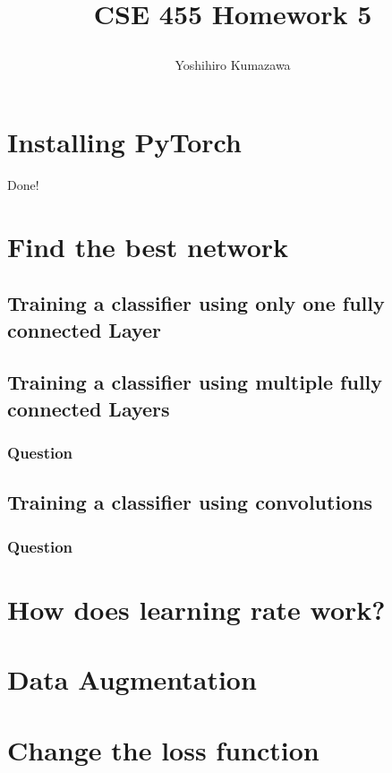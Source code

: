 \documentclass[12pt]{article}
\title{
  \vspace{-2cm}
  CSE 455 Homework 5 \\
  \author{Yoshihiro Kumazawa}
}
\begin{document}
\maketitle

\section{Installing PyTorch}
Done!

\section{Find the best network}
\subsection{Training a classifier using only one fully connected Layer}

\subsection{Training a classifier using multiple fully connected Layers}
\subsubsection{Question}

\subsection{Training a classifier using convolutions}
\subsubsection{Question}

\section{How does learning rate work?}

\section{Data Augmentation}

\section{Change the loss function}
\end{document}
